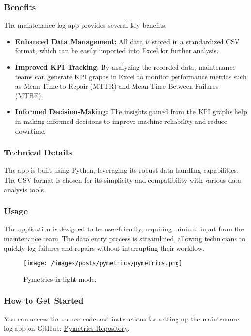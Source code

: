 \documentclass[11pt]{article}
\begin{document}
\subsubsection{Benefits}
\label{sec:orgff7c856}
The maintenance log app provides several key benefits:
\begin{itemize}
\item \textbf{Enhanced Data Management:} All data is stored in a standardized CSV format, which can be easily imported into Excel for further analysis.
\item \textbf{Improved KPI Tracking}: By analyzing the recorded data, maintenance teams can generate KPI graphs in Excel to monitor performance metrics such as Mean Time to Repair (MTTR) and Mean Time Between Failures (MTBF).
\item \textbf{Informed Decision-Making:} The insights gained from the KPI graphs help in making informed decisions to improve machine reliability and reduce downtime.
\end{itemize}
\subsubsection{Technical Details}
\label{sec:org23a0210}
The app is built using Python, leveraging its robust data handling capabilities. The CSV format is chosen for its simplicity and compatibility with various data analysis tools.
\subsubsection{Usage}
\label{sec:orgeb811bd}
The application is designed to be user-friendly, requiring minimal input from the maintenance team. The data entry process is streamlined, allowing technicians to quickly log failures and repairs without interrupting their workflow.

\begin{center}
\begin{figure}[htbp]
\centering
\texttt{[image: /images/posts/pymetrics/pymetrics.png]}
\caption{Pymetrics in light-mode.}
\end{figure}
\end{center}
\subsubsection{How to Get Started}
\label{sec:org3fa8642}
You can access the source code and instructions for setting up the maintenance log app on GitHub: \href{https://github.com/jpachecoxyz/pymetrics}{Pymetrics Repository}.
\end{document}

